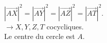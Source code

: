\documentclass[10pt]{beamer}
\newcommand{\vect}[1] {
  \overrightarrow{#1}}
\begin{document}
{\begin{columns}[t]
		
		\flushleft
		
		$|\vect{AX}|^2=|\vect{AY}|^2=|\vect{AZ}|^2=|\vect{AT}|^2$. \\ \bigskip
		$\rightarrow X,Y,Z,T$ cocycliques. \\ \medskip Le centre du cercle est $A$.
		
   
	   \end{columns}
    
    
    
    }  
  
\end{document}
